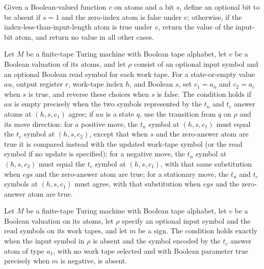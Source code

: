 \begin{definition}
\label{Complexity.Meyer.xinV}
\leanok
Given a Boolean-valued function $v$ on atoms and a bit $s$, define an optional bit to be
absent if $s=1$ and the zero-index atom is false under $v$; otherwise, if the
index-less-than-input-length atom is true under $v$, return the value of the input-bit
atom, and return no value in all other cases.
\end{definition}

\begin{definition}
\label{Complexity.Meyer.workOK}
\leanok
{}
Let $M$ be a finite-tape Turing machine with Boolean tape alphabet, let $v$ be a Boolean
valuation of its atoms, and let $\rho$ consist of an optional input symbol and an
optional Boolean read symbol for each work tape. For a state-or-empty value $	au$,
output register $r$, work-tape index $h$, and Boolean $s$, set $c_1=a_n$ and $c_2=a_c$
when $s$ is true, and reverse these choices when $s$ is false. The condition holds if
$	au$ is empty precisely when the two symbols represented by the $t_n$ and $t_c$ answer
atoms at $(h,s,c_1)$ agree; if $	au$ is a state $q$, use the transition from $q$ on
$\rho$ and its move direction: for a positive move, the $t_n$ symbol at $(h,s,c_1)$ must
equal the $t_c$ symbol at $(h,s,c_2)$, except that when $s$ and the zero-answer atom are
true it is compared instead with the updated work-tape symbol (or the read symbol if no
update is specified); for a negative move, the $t_n$ symbol at $(h,s,c_2)$ must equal
the $t_c$ symbol at $(h,s,c_1)$, with that same substitution when $
eg s$ and the zero-answer atom are true; for a stationary move, the $t_n$ and $t_c$
symbols at $(h,s,c_1)$ must agree, with that substitution when $
eg s$ and the zero-answer atom are true.
\end{definition}

\begin{definition}
\label{Complexity.Meyer.clampedA}
\leanok
{}
Let $M$ be a finite-tape Turing machine with Boolean tape alphabet, let $v$ be a Boolean
valuation on its atoms, let $\rho$ specify an optional input symbol and the read symbols
on its work tapes, and let $m$ be a sign. The condition holds exactly when the input
symbol in $\rho$ is absent and the symbol encoded by the $t_c$ answer atom of type
$a_1$, with no work tape selected and with Boolean parameter true precisely when $m$ is
negative, is absent.
\end{definition}

